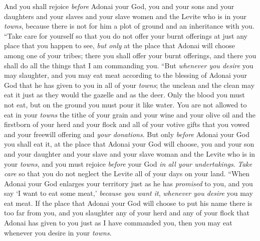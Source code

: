 \begin{biblechapter}
\verse And you shall rejoice \textit{before} Adonai your God, you and your sons and your daughters and your slaves and your slave women and the Levite who is in your \textit{towns}, because there is not for him a plot of ground and an inheritance with you.
\verse “Take care for yourself so that you do not offer your burnt offerings at just any place that you happen to see,
\verse \textit{but only} at the place that Adonai will choose among one of your tribes; there you shall offer your burnt offerings, and there you shall do all the things that I am commanding you.
\verse “But \textit{whenever you desire} you may slaughter, and you may eat meat according to the blessing of Adonai your God that he has given to you in all of your \textit{towns}; the unclean and the clean may eat it just as they would the gazelle and as the deer.
\verse Only the blood you must not eat, but on the ground you must pour it like water.
\verse You are not allowed to eat in your \textit{towns} the tithe of your grain and your wine and your olive oil and the firstborn of your herd and your flock and all of your votive gifts that you vowed and your freewill offering and \textit{your donations}.
\verse But only \textit{before} Adonai your God you shall eat it, at the place that Adonai your God will choose, you and your son and your daughter and your slave and your slave woman and the Levite who is in your \textit{towns}, and you must rejoice \textit{before} your God \textit{in all your undertakings}.
\verse \textit{Take care} so that you do not neglect the Levite all of your days on your land.
\verse “When Adonai your God enlarges your territory just as he has \textit{promised} to you, and you say ‘I want to eat some meat,’ \textit{because you want it}, \textit{whenever you desire} you may eat meat.
\verse If the place that Adonai your God will choose to put his name there is too far from you, and you slaughter any of your herd and any of your flock that Adonai has given to you just as I have commanded you, then you may eat whenever you desire in your \textit{towns}.

\end{biblechapter}
